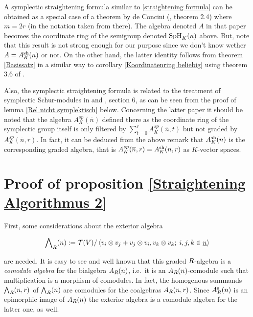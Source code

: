 \documentclass[twoside,12pt]{article}
\begin{document}
\begin{rem} \label{de concini}
A symplectic straightening formula similar to \ref{straightening
formula} can be obtained as a special case of a theorem by de Concini
(\cite{concini}, theorem 2.4)
where $m=2r$ (in the notation taken from there). 
The algebra denoted $A$ in that paper
becomes the coordinate ring of the semigroup denoted $\mmsp nK$ above.
But, note that this result is not strong enough for our purpose
since we don't know wether $A=\shAn K$ or not. On the other hand, the latter
identity follows from theorem \ref{Basissatz} in a similar way to corollary
\ref{Koordinatenring beliebig} using theorem 3.6 of \cite{concini}.
\end{rem}

Also, the symplectic straightening formula is related to the treatment
of symplectic Schur-modules in \cite{donk1} and \cite{iano}, section 6,
as can be seen from the proof of lemma \ref{Rel nicht symplektisch} below.
Concerning the latter paper it should be noted 
that the algebra $A^{sp}_{K}(\overline n)$ defined there
as the coordinate ring of the symplectic group itself is only filtered by
$\sum_{t=0}^r A^{sp}_{K}(\overline n,t)$ but not graded by 
$A^{sp}_{K}(\overline n,r)$. In fact, it can be deduced from the above
remark that $\shAn{K}$ is the corresponding graded algebra, 
that is $A^{sp}_{K}(\overline n,r)=\rshAn{K} r$
as $K$-vector spaces.











\section{Proof of proposition \ref{Straightening Algorithmus 2}}





First, some considerations about the exterior algebra 

\[\aA:= 
\tens{\nt}/\left<\bs i\otimes \bs j+\bs j\otimes \bs i, \bs
  k\otimes \bs k;\; i,j, k\in \mg n \right>
 \] 

are needed. It is easy to see and well known
that this graded $\gr$-algebra is a
{\em comodule algebra} for the bialgebra $\An{\gr}$, i.e.\
it is an $\An{\gr}$-comodule such that multiplication is a
morphism of comodules. In fact, the homogenous summands $\raA
r$ of $\aA$ are comodules for the coalgebras $\rAn{\gr}
r$. Since $\sAn{\gr}$ is an epimorphic image of $\An{\gr}$ the exterior
algebra is a comodule algebra for the latter one, as well.\Ab
\end{document}
